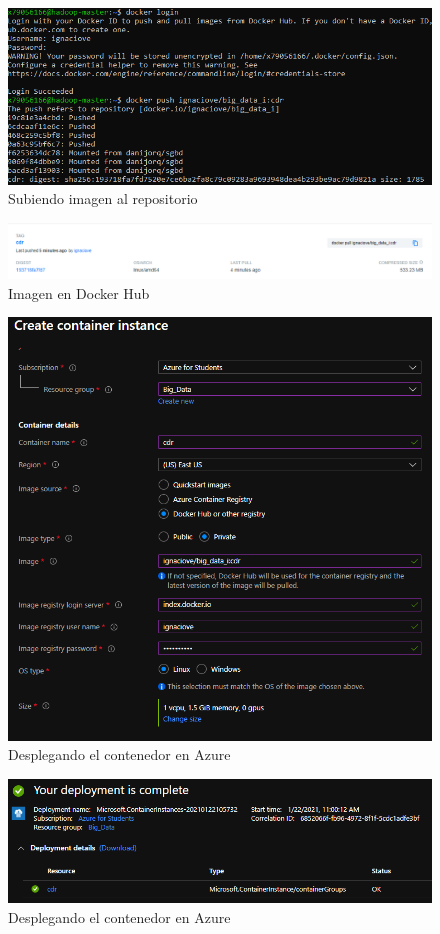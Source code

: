 \begin{figure}[H]\center\includegraphics[width=.95\linewidth]{img/r/r5.png}\caption{Subiendo imagen al repositorio}\end{figure}
\begin{figure}[H]\center\includegraphics[width=.95\linewidth]{img/r/r6.png}\caption{Imagen en Docker Hub}\end{figure}
\begin{figure}[H]\center\includegraphics[width=.95\linewidth]{img/r/r7.png}\caption{Desplegando el contenedor en Azure}\end{figure}

\begin{figure}[H]\center\includegraphics[width=.95\linewidth]{img/r/r8.png}\caption{Desplegando el contenedor en Azure}\end{figure}

